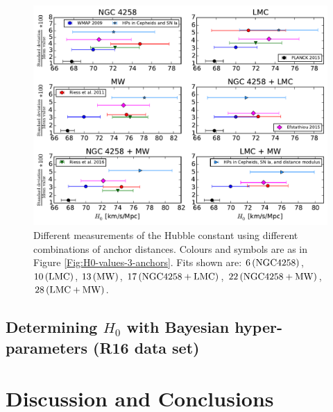 \begin{figure}[hbtp]
\centering
\includegraphics[scale=.75]{figures/chapter-h0/H0_values_anchor_combination.pdf}
\caption{Different measurements of the Hubble constant using different combinations of anchor distances. Colours and symbols are as in Figure \ref{Fig:H0-values-3-anchors}. Fits shown are: $6\,(\mathrm{NGC4258})$, $10\,(\mathrm{LMC})$, $13\,(\mathrm{MW})$, $17\,(\mathrm{NGC4258}+\mathrm{LMC})$, $22\,(\mathrm{NGC4258}+\mathrm{MW})$, $28\,(\mathrm{LMC}+\mathrm{MW})$.}
\label{Fig:single-combined-anchor}
\end{figure}

\subsection{Determining $H_0$ with Bayesian hyper-parameters (R16 data set)}
\label{Subsection:combining-anchors-R16}

\section{Discussion and Conclusions}
\label{chapter-h0:Summary}


